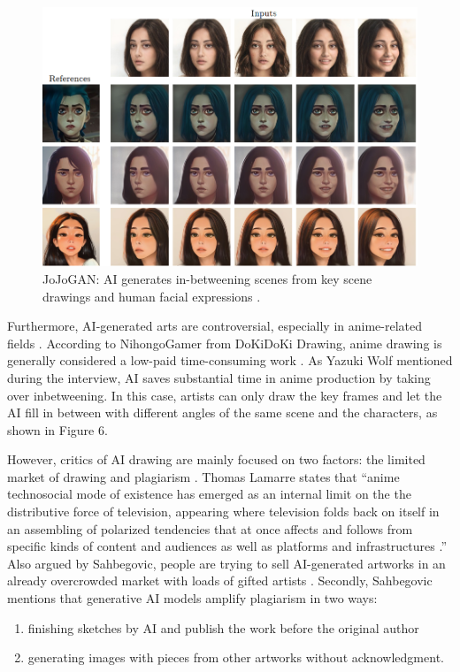 \begin{figure}[h]
    \includegraphics[width=\textwidth]{img/JoJo-2.png}
    \caption{
        JoJoGAN: AI generates in-betweening scenes from key scene drawings and human facial expressions \cite{chong2021jojogan}.
    }
\end{figure}
Furthermore, AI-generated arts are controversial,
especially in anime-related fields \cite{Sahbegovic2022anime}.
According to NihongoGamer from DoKiDoKi Drawing,
anime drawing is generally considered a low-paid time-consuming work \cite{NihongoGamer2022drawing}.
As Yazuki Wolf mentioned during the interview,
AI saves substantial time in anime production by taking over inbetweening.
In this case, artists can only draw the key frames and let the AI fill in between with different angles of the same scene and the characters, as shown in Figure 6.

However, critics of AI drawing are mainly focused on two factors:
the limited market of drawing and plagiarism \cite{Sahbegovic2022anime}.
Thomas Lamarre states that 
``anime technosocial mode of existence has emerged as an internal limit on the
the distributive force of television, appearing where television folds back on itself
in an assembling of polarized tendencies that at once affects and follows from
specific kinds of content and audiences as well as platforms and infrastructures \cite{Lamarre2018Anime}.''
Also argued by Sahbegovic,
people are trying to sell AI-generated artworks in an already overcrowded market
with loads of gifted artists \cite{Sahbegovic2022anime}.
Secondly, Sahbegovic mentions that generative AI models amplify plagiarism in two ways:
\begin{enumerate}
    \item finishing sketches by AI and publish the work before the original author
    \item generating images with pieces from other artworks without acknowledgment.
\end{enumerate}
   
